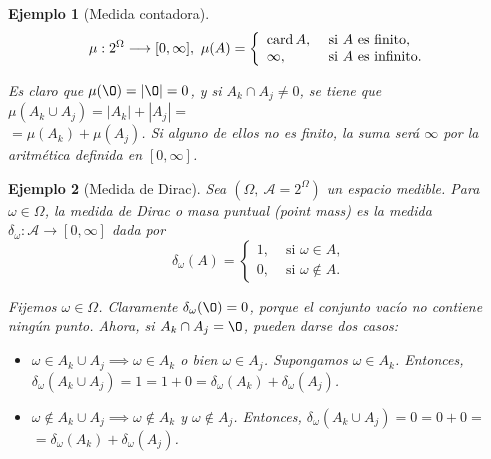 \documentclass[11pt, a4paper]{article}
\newif\IfInSansMode
\newcommand{\w}{\omega}
\theoremstyle{theorem-style}
\theoremstyle{definition-style}
\theoremstyle{remark-style}
\theoremstyle{example-style}
\newtheorem{ejemplo}{Ejemplo}[section]
\begin{document}
\begin{ejemplo}[Medida contadora]
\[ 
 \mu: 2^\Omega\longrightarrow [0,\infty] , \
 \mu (A) = \left\{ \begin{array}{ll}
                               \text{card\,} A , & \text{ si } A \text{ es finito,}
                               \\
                               \infty , &  \text{ si } A \text{ es infinito.}
                              \end{array}
                              \right.
 \]
 
 Es claro que $\mu(\O) = |\O| = 0$, y si $A_k \cap A_j \ne 0$, se tiene que $\mu(A_k \cup A_j) = |A_k| + |A_j| = $\\ $= \mu(A_k) + \mu(A_j)$. Si alguno de ellos no es finito, la suma será $\infty$ por la aritmética definida en $[0,\infty]$.
	
\end{ejemplo}

\begin{ejemplo}[Medida de Dirac]
Sea $(\Omega,\ \mathscr A=2^\Omega)$ un espacio medible. Para $\omega\in\Omega$, la medida de Dirac  o masa puntual (point mass) es la medida $\delta_\omega:\mathscr A \longrightarrow [0,\infty ]$ dada por 
 \[
 \delta_\omega (A) = \left\{ \begin{array}{ll}
                                1, & \text{ si } \omega\in A,
                               \\
                               0 , &  \text{ si } \omega\not\in A.
                              \end{array}
                              \right.
 \]
 
 Fijemos $\omega \in \Omega$. Claramente $\delta_\omega(\O) = 0$, porque el conjunto vacío no contiene ningún punto. Ahora, si $A_k \cap A_j = \O$, pueden darse dos casos:
 
\begin{itemize}
    \item $\omega \in A_k\cup A_j \implies \omega \in A_k$ o bien $\omega \in A_j$. Supongamos $\omega \in A_k$. Entonces, $\delta_\omega(A_k\cup A_j) = 1 = 1 + 0 = \delta_\w(A_k) + \delta_\w(A_j)$.
    \item $\w \notin A_k\cup A_j \implies \w \notin A_k$ y $\w \notin A_j$. Entonces, $\delta_\omega(A_k\cup A_j) = 0 = 0 + 0 =$ $=\delta_\w(A_k) + \delta_\w(A_j)$.
\end{itemize}
	
\end{ejemplo}
\end{document}
